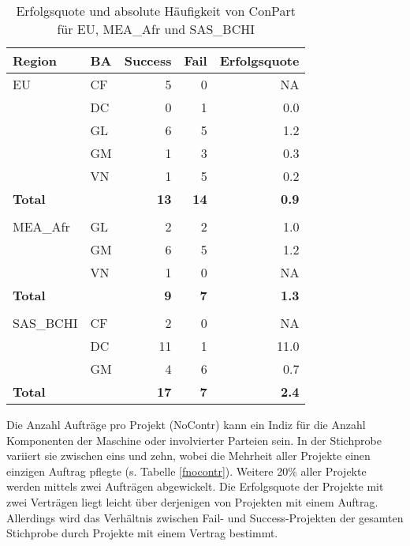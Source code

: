\begin{table}[htbp]
	\centering
	\caption{Erfolgsquote und absolute Häufigkeit von ConPart für EU, MEA\_Afr und SAS\_BCHI}
	\begin{tabular}{llrrr}
		\textbf{Region} & \textbf{BA} & \multicolumn{1}{l}{\textbf{Success}} & \multicolumn{1}{l}{\textbf{Fail}} & \multicolumn{1}{l}{\textbf{Erfolgsquote}} \\\hline
		EU  & CF    & 5     & 0     & NA \\
		    & DC    & 0     & 1     & 0.0 \\
		    & GL    & 6     & 5     & 1.2 \\
		    & GM    & 1     & 3     & 0.3 \\
		    &VN    & 1     & 5     & 0.2 \\\hline
		\textbf{Total} &  & \textbf{13} & \textbf{14} & \textbf{0.9} \\
			  &  &  & & \\
	    MEA\_Afr &	GL    & 2     & 2     & 1.0 \\
	             & 	GM    & 6     & 5     & 1.2 \\
		         & VN    & 1     & 0     & NA \\\hline
		\textbf{Total} &  & \textbf{9} & \textbf{7} & \textbf{1.3} \\
		& & & & \\
		    SAS\_BCHI & \multicolumn{1}{l}{CF} & 2     & 0     & NA \\
		 & \multicolumn{1}{l}{DC} & 11    & 1     & 11.0 \\
		  & \multicolumn{1}{l}{GM} & 4     & 6     & 0.7 \\\hline
		\textbf{Total} &       &  \textbf{17}   & \textbf{7}     & \textbf{2.4} \\
	\end{tabular}%
	\label{consregba}%
\end{table}%
%
%
\newpage
Die Anzahl Aufträge pro Projekt (NoContr) kann ein Indiz für die Anzahl Komponenten der Maschine oder involvierter Parteien sein. In der Stichprobe variiert sie zwischen eins und zehn, wobei die Mehrheit aller Projekte einen einzigen Auftrag pflegte (s. Tabelle \ref{fnocontr}). Weitere 20\% aller Projekte werden mittels zwei Aufträgen abgewickelt. Die Erfolgsquote der Projekte mit zwei Verträgen liegt leicht über derjenigen von Projekten mit einem Auftrag. Allerdings wird das Verhältnis zwischen Fail- und Success-Projekten der gesamten Stichprobe durch Projekte mit einem Vertrag bestimmt.
